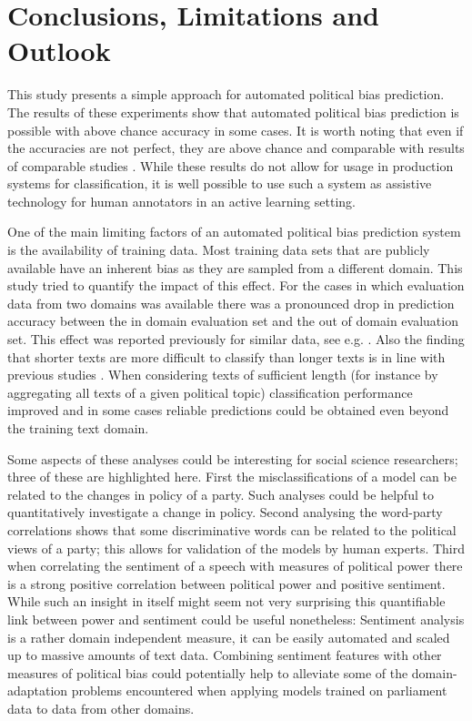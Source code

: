 \documentclass{article}
\begin{document}
\section{Conclusions, Limitations and Outlook}\label{sec:conclusion}
This study presents a simple approach for automated political bias prediction. The results of these experiments show that automated political bias prediction is possible with above chance accuracy in some cases. It is worth noting that even if the accuracies are not perfect, they are above chance and comparable with results of comparable studies \cite{Yu2008, Hirst2014}. While these results do not allow for usage in production systems for classification, it is well possible to use such a system as assistive technology for human annotators in an active learning setting.

One of the main limiting factors of an automated political bias prediction system is the availability of training data. Most training data sets that are publicly available have an inherent bias as they are sampled from a different domain. This study tried to quantify the impact of this effect.
For the cases in which evaluation data from two domains was available there was a pronounced drop in prediction accuracy between the in domain evaluation set and the out of domain evaluation set. This effect was reported previously for similar data, see e.g. \cite{Yu2008}. Also the finding that shorter texts are more difficult to classify than longer texts is in line with previous studies \cite{Hirst2014}. When considering texts of sufficient length (for instance by aggregating all texts of a given political topic) classification performance improved and in some cases reliable predictions could be obtained even beyond the training text domain.

Some aspects of these analyses could be interesting for social science researchers; three of these are highlighted here.
First the misclassifications of a model can be related to the changes in policy of a party. Such analyses could be helpful to quantitatively investigate a change in policy. Second analysing the word-party correlations shows that some discriminative words can be related to the political views of a party; this allows for validation of the models by human experts. Third when correlating the sentiment of a speech with measures of political power there is a strong positive correlation between political power and positive sentiment. While such an insight in itself might seem not very surprising this quantifiable link between power and sentiment could be useful nonetheless: Sentiment analysis is a rather domain independent measure, it can be easily automated and scaled up to massive amounts of text data. Combining sentiment features with other measures of political bias could potentially help to alleviate some of the domain-adaptation problems encountered when applying models trained on parliament data to data from other domains. \\
\end{document}
